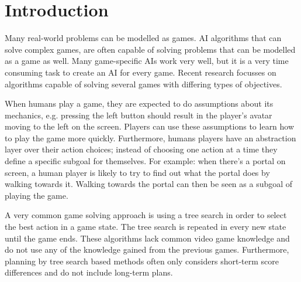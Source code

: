 \section{Introduction}
\label{sec:introduction}
%

Many real-world problems can be modelled as games. AI algorithms that can solve
complex games, are often capable of solving problems that can be modelled
as a game as well. Many game-specific AIs work very well, but it is a very time
consuming task to create an AI for every game. Recent research
focusses on algorithms capable of solving several games with differing types of
objectives. 


When humans play a game, they are expected to do assumptions about
its mechanics, e.g. pressing the left button should result in the player's
avatar moving to the left on the screen. Players can use these assumptions to
learn how to play the game more quickly. Furthermore, humans players 
have an abstraction layer over their action choices; instead of
choosing one action at a time they define a specific subgoal for themselves. 
For example: when there's a portal on screen, a human player is
likely to try to find out what the portal does by walking towards it. Walking
towards the portal can then be seen as a subgoal of playing the game.

A very common game solving approach is using a tree search in order to select
the best action in a game state. The tree search is repeated in every new state
until the game ends. These algorithms lack common video game knowledge and do
not use any of the knowledge gained from the previous games.
Furthermore, planning by tree search based methods often only considers
short-term score differences and do not include long-term plans. 

